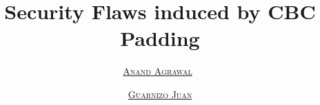 \documentclass[presentation, aspectratio=54]{beamer}
\title{Security Flaws induced by CBC Padding}
\author{\textsc{\underline{Anand Agrawal}}\ \and
    \textsc{\underline{Guarnizo Juan}}}
\begin{document}
\frame{\titlepage}






%     
%     

%
\end{document}
